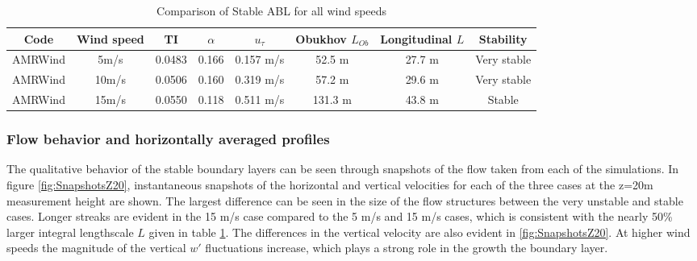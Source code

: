 \begin{table}
\caption{\label{tab:CompareAMRallWS} Comparison of Stable ABL for all
  wind speeds} \centering
\begin{tabular}{cccccccc}
  \hline
  Code & Wind speed   & TI     & $\alpha$& $u_\tau$ & Obukhov $L_{Ob}$ & Longitudinal $L$ & Stability \\
  \hline
  AMRWind & 5m/s      & 0.0483 &  0.166 &  0.157 m/s  &  52.5 m & 27.7 m  & Very stable\\
  AMRWind & 10m/s     & 0.0506 &  0.160 &  0.319 m/s  &  57.2 m & 29.6 m  & Very stable\\
  AMRWind & 15m/s     & 0.0550 &  0.118 &  0.511 m/s  & 131.3 m & 43.8 m  & Stable \\
  \hline
\end{tabular}
\end{table}

\subsubsection{Flow behavior and horizontally averaged profiles}

The qualitative behavior of the stable boundary layers can be seen
through snapshots of the flow taken from each of the simulations.  In
figure \ref{fig:SnapshotsZ20}, instantaneous snapshots of the
horizontal and vertical velocities for each of the three cases at the
z=20m measurement height are shown.  The largest difference can be
seen in the size of the flow structures between the very unstable and
stable cases.  Longer streaks are evident in the 15 m/s case compared
to the 5 m/s and 15 m/s cases, which is consistent with the nearly
50\% larger integral lengthscale $L$ given in table
\ref{tab:CompareAMRallWS}.  The differences in the vertical velocity
are also evident in \ref{fig:SnapshotsZ20}.  At higher wind speeds the
magnitude of the vertical $w'$ fluctuations increase, which plays a
strong role in the growth the boundary layer.

